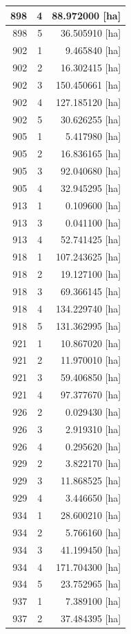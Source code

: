 \documentclass[11pt,]{book}
\begin{document}
\begin{table}
\begin{tabular}[t]{r|r|r}
\hline
898 & 4 & 88.972000 [ha]\\
\hline
898 & 5 & 36.505910 [ha]\\
\hline
902 & 1 & 9.465840 [ha]\\
\hline
902 & 2 & 16.302415 [ha]\\
\hline
902 & 3 & 150.450661 [ha]\\
\hline
902 & 4 & 127.185120 [ha]\\
\hline
902 & 5 & 30.626255 [ha]\\
\hline
905 & 1 & 5.417980 [ha]\\
\hline
905 & 2 & 16.836165 [ha]\\
\hline
905 & 3 & 92.040680 [ha]\\
\hline
905 & 4 & 32.945295 [ha]\\
\hline
913 & 1 & 0.109600 [ha]\\
\hline
913 & 3 & 0.041100 [ha]\\
\hline
913 & 4 & 52.741425 [ha]\\
\hline
918 & 1 & 107.243625 [ha]\\
\hline
918 & 2 & 19.127100 [ha]\\
\hline
918 & 3 & 69.366145 [ha]\\
\hline
918 & 4 & 134.229740 [ha]\\
\hline
918 & 5 & 131.362995 [ha]\\
\hline
921 & 1 & 10.867020 [ha]\\
\hline
921 & 2 & 11.970010 [ha]\\
\hline
921 & 3 & 59.406850 [ha]\\
\hline
921 & 4 & 97.377670 [ha]\\
\hline
926 & 2 & 0.029430 [ha]\\
\hline
926 & 3 & 2.919310 [ha]\\
\hline
926 & 4 & 0.295620 [ha]\\
\hline
929 & 2 & 3.822170 [ha]\\
\hline
929 & 3 & 11.868525 [ha]\\
\hline
929 & 4 & 3.446650 [ha]\\
\hline
934 & 1 & 28.600210 [ha]\\
\hline
934 & 2 & 5.766160 [ha]\\
\hline
934 & 3 & 41.199450 [ha]\\
\hline
934 & 4 & 171.704300 [ha]\\
\hline
934 & 5 & 23.752965 [ha]\\
\hline
937 & 1 & 7.389100 [ha]\\
\hline
937 & 2 & 37.484395 [ha]\\

\end{tabular}
\end{table}
\end{document}
